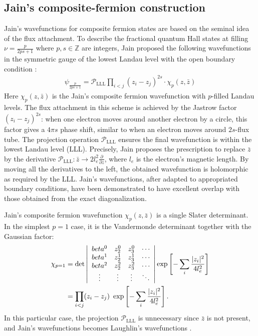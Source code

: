 \subsection{Jain's composite-fermion construction}
Jain's wavefunctions for composite fermion states \cite{jain1989composite,jain1989incompressible,jain1990theory,jain2007composite,balram2013state} are based on the seminal idea of the flux attachment. To describe the fractional quantum Hall states at filling $\nu=\frac{p}{2ps+1}$ where $p,s\in\mathbb Z$ are integers, Jain proposed the following wavefunctions in the symmetric gauge of the lowest Landau level with the open boundary condition \cite{kamilla1996composite}:
\begin{align}\label{eq1. Jain's wave function}
\psi_{\frac{p}{2ps+1}}=\mathcal P_{\text{LLL}} \prod_{i<j} (z_i-z_j)^{2s}\cdot \chi_p(z,\bar z)
\end{align}
Here $\chi_p(z,\bar z)$ is the Jain's composite fermion wavefunction with $p$-filled Landau levels. The flux attachment in this scheme is achieved by the Jastrow factor $(z_i-z_j)^{2s}$: when one electron moves around another electron by a circle, this factor gives a $4\pi s$ phase shift, similar to when an electron moves around $2s$-flux tube. The projection operation $\mathcal P_{\text{LLL}}$ ensures the final wavefunction is within the lowest Landau level (LLL). Precisely, Jain proposes the prescription to replace $\bar z$ by the derivative $\mathcal P_{\text{LLL}}: \bar z\rightarrow 2 l_e^2 \frac{\partial}{\partial z}$, where $l_e$ is the electron's magnetic length. By moving all the derivatives to the left, the obtained wavefunction is holomorphic as required by the LLL. Jain's wavefunctions, after adapted to appropriated boundary conditions, have been demonstrated to have excellent overlap with those obtained from the exact diagonalization. 

Jain's composite fermion wavefunction $\chi_p(z,\bar z)$ is a single Slater determinant. In the simplest $p=1$ case, it is the Vandermonde determinant together with the Gaussian factor:
\begin{align}
\chi_{p=1}&=\det\left|\begin{array}{cccc} 
        beta^0 & z_2^0 & z_3^0 & \cdots\\
        beta^1 & z_2^1 & z_3^1 & \cdots\\
        beta^2 & z_2^2 & z_3^2 & \cdots\\
        \vdots & \vdots &\vdots &\ddots
    \end{array}\right|\exp\left[-\sum_{i}\frac{|z_i|^2}{4l_e^2}\right]\notag\\
&=\prod_{i<j}(z_i-z_j)~\exp\left[-\sum_{i}\frac{|z_i|^2}{4l_e^2}\right].\label{eq.2 Jain's CF wave function}
\end{align}
In this particular case, the projection $\mathcal P_{\text{LLL}}$ is unnecessary since $\bar z$ is not present, and Jain's wavefunctions becomes Laughlin's wavefunctions \cite{laughlin1983anomalous}.

